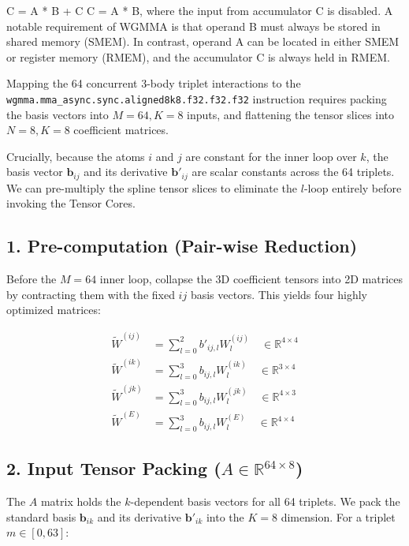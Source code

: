 \documentclass[12pt]{article}
\begin{document}
C = A * B + C
C = A * B, where the input from accumulator C is disabled.
A notable requirement of WGMMA is that operand B must always be stored in shared memory (SMEM). In contrast, operand A can be located in either SMEM or register memory (RMEM), and the accumulator C is always held in RMEM.



Mapping the 64 concurrent 3-body triplet interactions to the \texttt{wgmma.mma\_async.sync.aligned8k8.f32.f32.f32} instruction requires packing the basis vectors into $M=64, K=8$ inputs, and flattening the tensor slices into $N=8, K=8$ coefficient matrices. 

Crucially, because the atoms $i$ and $j$ are constant for the inner loop over $k$, the basis vector $\mathbf{b}_{ij}$ and its derivative $\mathbf{b}'_{ij}$ are scalar constants across the 64 triplets. We can pre-multiply the spline tensor slices to eliminate the $l$-loop entirely before invoking the Tensor Cores.

\subsection*{1. Pre-computation (Pair-wise Reduction)}
Before the $M=64$ inner loop, collapse the 3D coefficient tensors into 2D matrices by contracting them with the fixed $ij$ basis vectors. This yields four highly optimized matrices:

\begin{align}
\widetilde{W}^{(ij)} &= \sum_{l=0}^{2} b'_{ij, l} W^{(ij)}_{l} \quad \in \mathbb{R}^{4 \times 4} \\
\widetilde{W}^{(ik)} &= \sum_{l=0}^{3} b_{ij, l} W^{(ik)}_{l} \quad \in \mathbb{R}^{3 \times 4} \\
\widetilde{W}^{(jk)} &= \sum_{l=0}^{3} b_{ij, l} W^{(jk)}_{l} \quad \in \mathbb{R}^{4 \times 3} \\
\widetilde{W}^{(E)}  &= \sum_{l=0}^{3} b_{ij, l} W^{(E)}_{l}  \quad \in \mathbb{R}^{4 \times 4}
\end{align}

\subsection*{2. Input Tensor Packing ($A \in \mathbb{R}^{64 \times 8}$)}
The $A$ matrix holds the $k$-dependent basis vectors for all 64 triplets. We pack the standard basis $\mathbf{b}_{ik}$ and its derivative $\mathbf{b}'_{ik}$ into the $K=8$ dimension. For a triplet $m \in [0, 63]$:
\end{document}

